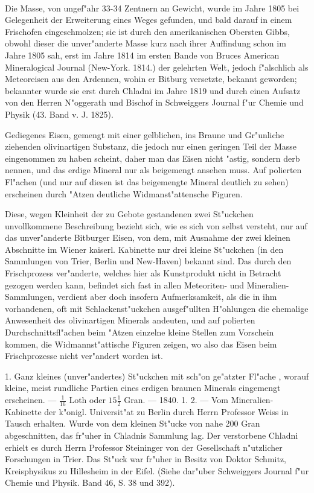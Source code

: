 \documentclass[a4paper, 11pt, oneside, polutonikogreek, german]{article}
\begin{document}
\paragraph{}
Die Masse, von ungef"ahr 33-34 Zentnern an Gewicht, wurde im Jahre 1805 bei Gelegenheit der Erweiterung eines Weges gefunden, und bald darauf in einem Frischofen eingeschmolzen; sie ist durch den amerikanischen Obersten Gibbs, obwohl dieser die unver"anderte Masse kurz nach ihrer Auffindung schon im Jahre 1805 sah, erst im Jahre 1814 im ersten Bande von Bruces American Mineralogical Journal (New-York. 1814.) der gelehrten Welt, jedoch f"alschlich als Meteoreisen aus den Ardennen, wohin er Bitburg versetzte, bekannt geworden; bekannter wurde sie erst durch Chladni im Jahre 1819 und durch einen Aufsatz von den Herren N"oggerath und Bischof in Schweiggers Journal f"ur Chemie und Physik (43. Band v. J. 1825).

Gediegenes Eisen, gemengt mit einer gelblichen, ins Braune und Gr"unliche ziehenden olivinartigen Substanz, die jedoch nur einen geringen Teil der Masse eingenommen zu haben scheint, daher man das Eisen nicht "astig, sondern derb nennen, und das erdige Mineral nur als beigemengt ansehen muss. Auf polierten Fl"achen (und nur auf diesen ist das beigemengte Mineral deutlich zu sehen) erscheinen durch "Atzen deutliche Widmanst"attensche Figuren.

\setlength{\leftskip}{10mm}
\setlength{\parindent}{0pt}

{\footnotesize Diese, wegen Kleinheit der zu Gebote gestandenen zwei St"uckchen unvollkommene Beschreibung bezieht sich, wie es sich von selbst versteht, nur auf das unver"anderte Bitburger Eisen, von dem, mit Ausnahme der zwei kleinen Abschnitte im Wiener kaiserl. Kabinette nur drei kleine St"uckchen (in den Sammlungen von Trier, Berlin und New-Haven) bekannt sind. Das durch den Frischprozess ver"anderte, welches hier als Kunstprodukt nicht in Betracht gezogen werden kann, befindet sich fast in allen Meteoriten- und Mineralien-Sammlungen, verdient aber doch insofern Aufmerksamkeit, als die in ihm vorhandenen, oft mit Schlackenst"uckchen ausgef"ullten H"ohlungen die ehemalige Anwesenheit des olivinartigen Minerals andeuten, und auf polierten Durchschnittsfl"achen beim "Atzen einzelne kleine Stellen zum Vorschein kommen, die Widmannst"attische Figuren zeigen, wo also das Eisen beim Frischprozesse nicht ver"andert worden ist.}

\setlength{\leftskip}{0pt}
\setlength{\parindent}{20pt}

1. Ganz kleines (unver"andertes) St"uckchen mit sch"on ge"atzter Fl"ache , worauf kleine, meist rundliche Partien eines erdigen braunen Minerals eingemengt erscheinen. --- $\frac{1}{16}$ Loth oder $15\frac{1}{2}$ Gran. --- 1840. 1. 2. --- Vom Mineralien-Kabinette der k"onigl. Universit"at zu Berlin durch Herrn Professor Weiss in Tausch erhalten. Wurde von dem kleinen St"ucke von nahe 200 Gran abgeschnitten, das fr"uher in Chladnis Sammlung lag. Der verstorbene Chladni erhielt es durch Herrn Professor Steininger von der Gesellschaft n"utzlicher Forschungen in Trier. Das St"uck war fr"uher in Besitz von Doktor Schmitz, Kreisphysikus zu Hillesheim in der Eifel. (Siehe dar"uber Schweiggers Journal f"ur Chemie und Physik. Band 46, S. 38 und 392).
\end{document}
